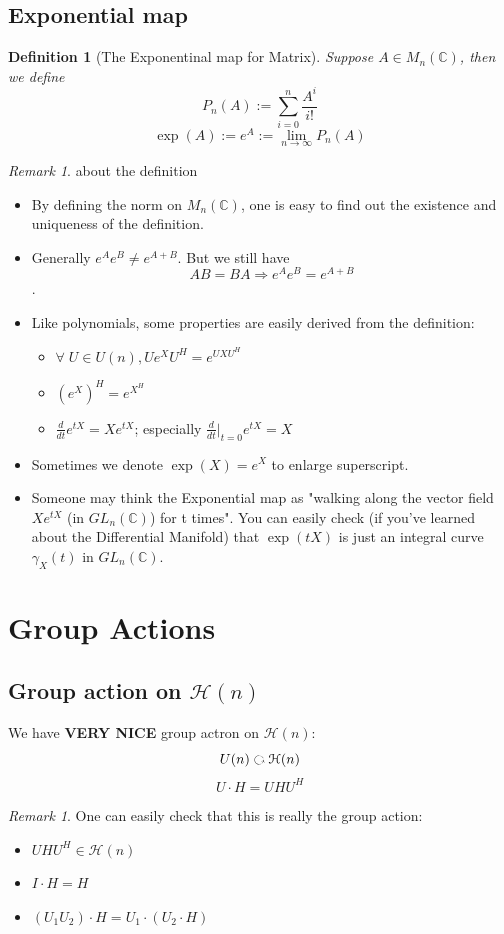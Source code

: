 \documentclass[11pt]{amsart}
\numberwithin{equation}{section}
\theoremstyle{plain}
\newtheorem{defn}[theorem]{Definition}
\theoremstyle{plain}
\numberwithin{equation}{section}
\theoremstyle{remark}
\newtheorem{remark}[theorem]{Remark}
\begin{document}
\subsection*{Exponential map}
\begin{defn}[The Exponentinal map for Matrix]
Suppose $A \in M_n(\mathbb{C})$, then we define
$$P_n(A):= \sum_{i=0}^{n} \frac{A^i}{i!}$$
$$\exp(A):= e^A :=\lim\limits_{n \rightarrow \infty}P
_n(A)$$
\end{defn}
\begin{remark}{about the definition}
	\begin{itemize}
		\item By defining the norm on $M_n(\mathbb{C})$, one is easy to find out the existence and uniqueness of the definition.
		\item Generally $e^Ae^B \neq e^{A+B}$. But we still have
		$$AB=BA \Rightarrow e^Ae^B = e^{A+B}$$.
		\item Like polynomials, some  properties  are
		easily derived from the definition:
		\begin{itemize}
			\item $\displaystyle\forall \;U \in U(n), Ue^X U^H=e^{UXU^H}$
			\item $\displaystyle(e^X)^H=e^{X^H}$
			\item $\displaystyle\frac{d}{dt} e^{tX}=Xe^{tX}$; especially $\displaystyle\frac{d}{dt}\big|_{t=0} e^{tX}=X$
		\end{itemize}
	\item Sometimes we denote $\exp(X)=e^X$ to
	enlarge superscript.
	\item Someone may think the Exponential map as 
	"walking along the vector field $Xe^{tX}$ (in $GL_n(\mathbb{C})$) for t times".
	You can easily check (if you’ve learned about the Differential Manifold) that $\exp(tX)$ is just an integral curve $\gamma_X(t)$ in $GL_n(\mathbb{C})$.
	\end{itemize}

\end{remark}

\section{Group Actions} 
\subsection{Group action on $\mathcal{H}(n)$}
We have \textbf{VERY NICE} group actron on $\mathcal{H}(n)$:
$$U(n) \text{ \rotatebox[origin=c]{270}{$\circlearrowleft$} } \mathcal{H}(n)$$
$$U \cdot H =UHU^H$$
\begin{remark}
	One can easily check that this is really the group action:
	\begin{itemize}
		\item $UHU^H \in \mathcal{H}(n)$
		\item $I \cdot H =H$
		\item $(U_1U_2) \cdot H =U_1 \cdot(U_2 \cdot H)$
	\end{itemize}
\end{remark}
\end{document}
